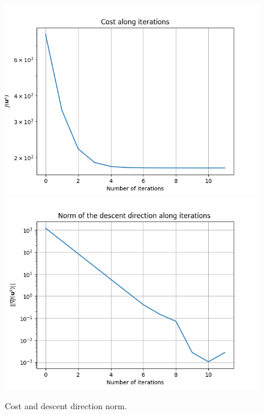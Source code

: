  \begin{figure}[h]
  \centering
  \includegraphics[width=1\textwidth]{pictures/cost_task1.png}\hfill \\
  \includegraphics[width=1\textwidth]{pictures/descent_task1.png}\hfill
  \caption{Cost and descent direction norm.}
\end{figure}
